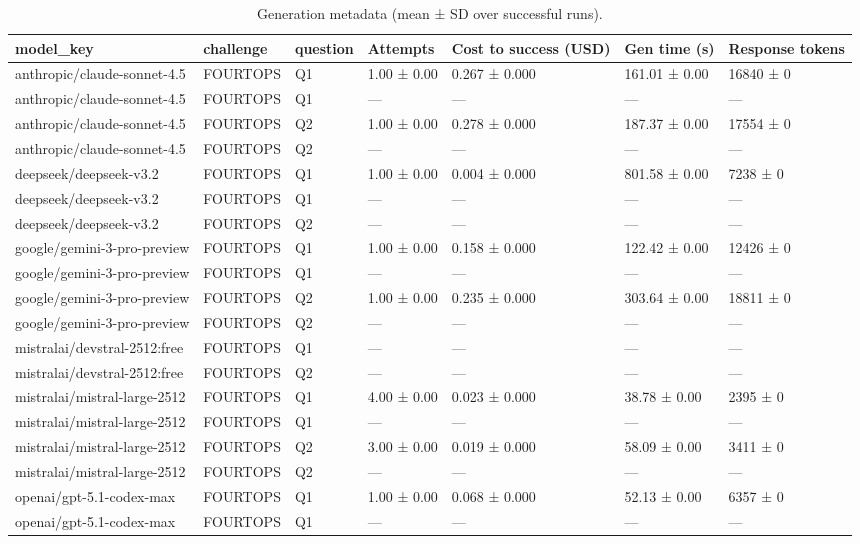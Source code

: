 \begin{table}
\caption{Generation metadata (mean ± SD over successful runs).}
\label{tab:benchmark_metadata_generation}
\begin{tabular}{lllllll}
\toprule
model\_key & challenge & question & Attempts & Cost to success (USD) & Gen time (s) & Response tokens \\
\midrule
anthropic/claude-sonnet-4.5 & FOURTOPS & Q1 & 1.00 ± 0.00 & 0.267 ± 0.000 & 161.01 ± 0.00 & 16840 ± 0 \\
anthropic/claude-sonnet-4.5 & FOURTOPS & Q1 & — & — & — & — \\
anthropic/claude-sonnet-4.5 & FOURTOPS & Q2 & 1.00 ± 0.00 & 0.278 ± 0.000 & 187.37 ± 0.00 & 17554 ± 0 \\
anthropic/claude-sonnet-4.5 & FOURTOPS & Q2 & — & — & — & — \\
deepseek/deepseek-v3.2 & FOURTOPS & Q1 & 1.00 ± 0.00 & 0.004 ± 0.000 & 801.58 ± 0.00 & 7238 ± 0 \\
deepseek/deepseek-v3.2 & FOURTOPS & Q1 & — & — & — & — \\
deepseek/deepseek-v3.2 & FOURTOPS & Q2 & — & — & — & — \\
google/gemini-3-pro-preview & FOURTOPS & Q1 & 1.00 ± 0.00 & 0.158 ± 0.000 & 122.42 ± 0.00 & 12426 ± 0 \\
google/gemini-3-pro-preview & FOURTOPS & Q1 & — & — & — & — \\
google/gemini-3-pro-preview & FOURTOPS & Q2 & 1.00 ± 0.00 & 0.235 ± 0.000 & 303.64 ± 0.00 & 18811 ± 0 \\
google/gemini-3-pro-preview & FOURTOPS & Q2 & — & — & — & — \\
mistralai/devstral-2512:free & FOURTOPS & Q1 & — & — & — & — \\
mistralai/devstral-2512:free & FOURTOPS & Q2 & — & — & — & — \\
mistralai/mistral-large-2512 & FOURTOPS & Q1 & 4.00 ± 0.00 & 0.023 ± 0.000 & 38.78 ± 0.00 & 2395 ± 0 \\
mistralai/mistral-large-2512 & FOURTOPS & Q1 & — & — & — & — \\
mistralai/mistral-large-2512 & FOURTOPS & Q2 & 3.00 ± 0.00 & 0.019 ± 0.000 & 58.09 ± 0.00 & 3411 ± 0 \\
mistralai/mistral-large-2512 & FOURTOPS & Q2 & — & — & — & — \\
openai/gpt-5.1-codex-max & FOURTOPS & Q1 & 1.00 ± 0.00 & 0.068 ± 0.000 & 52.13 ± 0.00 & 6357 ± 0 \\
openai/gpt-5.1-codex-max & FOURTOPS & Q1 & — & — & — & — \\

\end{tabular}
\end{table}
